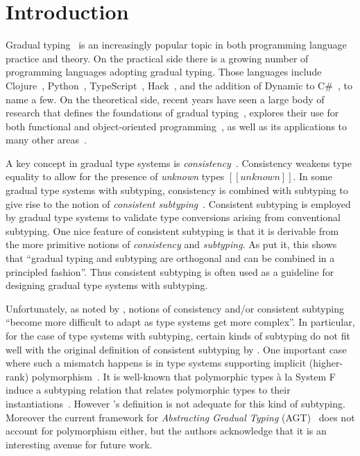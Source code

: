 \section{Introduction}
\label{sec:introduction}

Gradual typing~\citep{siek2006gradual} is an increasingly popular topic in both
programming language practice and theory. On the practical side there is a
growing number of programming languages adopting gradual typing. Those languages
include Clojure~\citep{Bonnaire_Sergeant_2016}, Python~\citep{Vitousek_2014, lehtosalo2016mypy},
TypeScript~\citep{typescript}, Hack~\citep{verlaguet2013facebook}, and the
addition of Dynamic to C\#~\citep{Bierman_2010}, to name a few. On the
theoretical side, recent years have seen a large body of research that defines
the foundations of gradual typing~\citep{garcia2016abstracting,
  cimini2016gradualizer, CiminiPOPL}, explores their use for both functional and
object-oriented programming~\citep{siek2006gradual, siek2007gradual}, as well as
its applications to many other areas~\citep{siek2016key, Ba_ados_Schwerter_2014,
  castagna2017gradual, Jafery:2017:SUR:3093333.3009865}.

A key concept in gradual type systems is
\emph{consistency}~\citep{siek2006gradual}. Consistency weakens type equality to allow
for the presence of \emph{unknown} types $[[ unknown ]]$. In some gradual type systems
with subtyping, consistency is combined with subtyping to give rise to
the notion of \emph{consistent subtyping}~\citep{siek2007gradual}. Consistent
subtyping is employed by gradual type systems to validate type
conversions arising from conventional subtyping. One nice feature of consistent
subtyping is that it is derivable from the more primitive
notions of \emph{consistency} %
and \emph{subtyping}. As \citet{siek2007gradual}
put it, this shows that
``gradual typing and subtyping are orthogonal and can be combined in a principled fashion''.
Thus consistent subtyping is often used as a guideline for
designing gradual type systems with subtyping. 

Unfortunately, as noted by \citet{garcia2016abstracting}, notions of
consistency and/or consistent subtyping ``become more difficult to adapt
  as type systems get more complex''. In particular, for the case of type
systems with subtyping, certain kinds of subtyping do not fit well with the
original definition of consistent subtyping by \citet{siek2007gradual}. One
important case where such a mismatch happens is in type systems supporting
implicit (higher-rank) polymorphism~\citep{jones2007practical,dunfield2013complete, odersky1996putting}.
It is well-known that polymorphic types
\`a la System F induce a subtyping relation that relates polymorphic types to
their instantiations~\citep{odersky1996putting, mitchell1990polymorphic}. However
\citeauthor{siek2007gradual}'s definition is not adequate for this kind of
subtyping. Moreover the current framework for \emph{Abstracting Gradual
Typing} (AGT)~\citep{garcia2016abstracting} does not account for
polymorphism either, but the authors
acknowledge that it is an interesting avenue for future work. 

